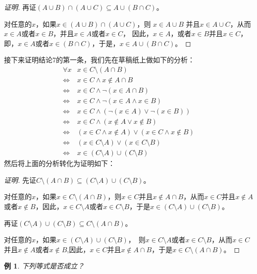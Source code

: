 \documentclass{book}[oneside]
\newtheorem*{Example}{例}
\begin{document}
\begin{CJK*}{UTF8}{gbsn}
\begin{proof}[证明]
  再证$(A \cup B) \cap (A \cup C) \subseteq A \cup (B \cap C)$。

    对任意的$x$，如果$x \in (A \cup B) \cap (A \cup C)$，则 $x \in A \cup B$ 并且$x \in A \cup C$，从而$x \in A$或者$x \in B$，并且$x \in A$或者$ x \in C$，
  因此，$x \in A$，或者$x \in B$并且$ x \in C$，即，$x \in A$或者$x \in (B \cap C)$，于是，$x \in A \cup (B \cap C)$。

\end{proof}
接下来证明结论7的第一条，我们先在草稿纸上做如下的分析：
\begin{equation*}
  \begin{split}
    \forall x &x \in C\setminus (A\cap B)\\
    \Leftrightarrow&x \in C \land x \notin A\cap B\\
    \Leftrightarrow&x \in C \land \lnot (x \in A\cap B)\\
    \Leftrightarrow&x \in C \land \lnot (x \in A \land x \in B)\\
    \Leftrightarrow&x \in C \land (\lnot (x \in A) \lor \lnot (x \in B))\\
    \Leftrightarrow&x \in C \land (x \notin A \lor x \notin B)\\
    \Leftrightarrow&(x \in C \land x \notin A) \lor (x \in C \land x \notin B)\\
    \Leftrightarrow&(x \in C\setminus A)\lor (x\in C\setminus B)\\
    \Leftrightarrow&x \in (C\setminus A) \cup (C \setminus B)
  \end{split}
\end{equation*}
然后将上面的分析转化为证明如下：  
\begin{proof}[证明]
  先证$C\setminus (A\cap B)\subseteq (C\setminus A) \cup (C \setminus B)$。

  对任意的$x$，如果$x \in C\setminus (A\cap B)$，则$x \in C$并且$x \notin A\cap B$，从而$x \in C$并且$x\notin A$或者$x\notin B$，因此，$x\in C\setminus A$或者$x\in C\setminus B$，于是$x\in (C\setminus A) \cup (C \setminus B)$。

  再证$(C\setminus A) \cup (C \setminus B) \subseteq C\setminus (A\cap B)$。

  对任意的$x$，如果$x\in (C\setminus A) \cup (C \setminus B)$，　则$x\in C\setminus A$或者$x\in C\setminus B$，从而$x \in C$并且$x\notin A$或者$x\notin B$,因此，$x \in C$并且$x \notin A\cap B$，于是$x \in C\setminus (A\cap B)$。
\end{proof}
\begin{Example}
下列等式是否成立？


\end{Example}
\end{CJK*}
\end{document}
